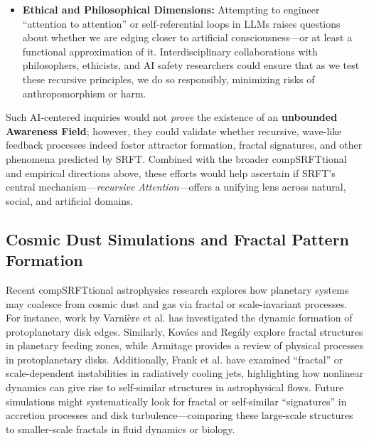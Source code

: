 \documentclass[12pt,a4paper]{article}
\begin{document}
\begin{itemize}
    \item \textbf{Ethical and Philosophical Dimensions:}
    Attempting to engineer “attention to attention” or self-referential loops in LLMs raises questions about whether we are edging closer to artificial consciousness—or at least a functional approximation of it. Interdisciplinary collaborations with philosophers, ethicists, and AI safety researchers could ensure that as we test these recursive principles, we do so responsibly, minimizing risks of anthropomorphism or harm.

\end{itemize}

Such AI-centered inquiries would not \emph{prove} the existence of an \textbf{unbounded Awareness Field}; however, they could validate whether recursive, wave-like feedback processes indeed foster attractor formation, fractal signatures, and other phenomena predicted by SRFT. Combined with the broader compSRFTtional and empirical directions above, these efforts would help ascertain if SRFT’s central mechanism—\emph{recursive Attention}—offers a unifying lens across natural, social, and artificial domains.


\subsection{Cosmic Dust Simulations and Fractal Pattern Formation}
\label{subsec:cosmic-dust}
Recent compSRFTtional astrophysics research explores how planetary systems may coalesce from cosmic dust and gas via fractal or scale-invariant processes. For instance, work by Varnière et al. \cite{Varniere2003} has investigated the dynamic formation of protoplanetary disk edges. Similarly, Kovács and Regály \cite{Kovacs2014} explore fractal structures in planetary feeding zones, while Armitage \cite{Armitage2015} provides a review of physical processes in protoplanetary disks. 
Additionally, Frank et al. \cite{Frank1997} have examined ``fractal'' or scale-dependent instabilities in radiatively cooling jets, highlighting how nonlinear dynamics can give rise to self-similar structures in astrophysical flows.
Future simulations might systematically look for fractal or self-similar ``signatures'' in accretion processes and disk turbulence---comparing these large-scale structures to smaller-scale fractals in fluid dynamics or biology.
\end{document}
